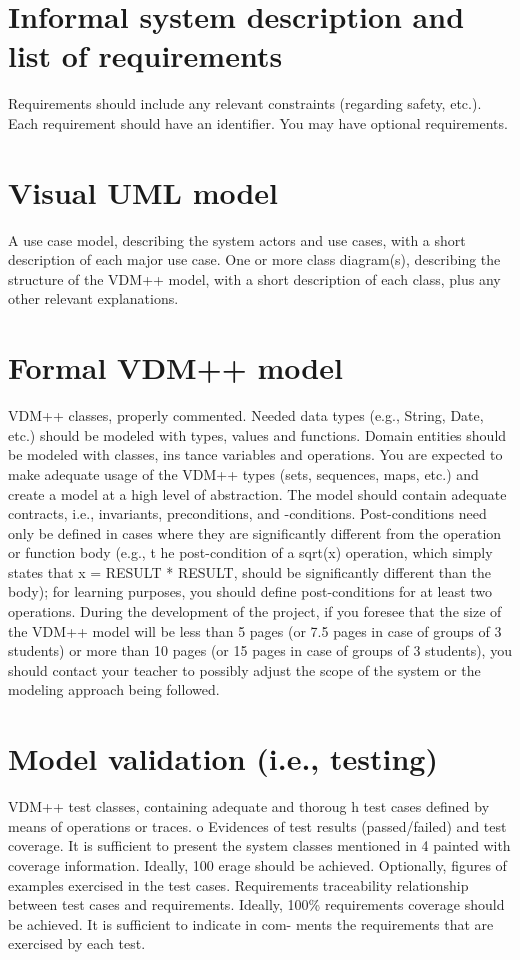 \documentclass[a4paper]{article}
\begin{document}

\newpage
\tableofcontents
\newpage

\section{Informal system description and list of requirements}
Requirements should include any relevant constraints (regarding safety, etc.). 
Each requirement should have an identifier. 
You may have optional requirements. 
\section{Visual UML model}
A use case model, describing the system actors and 
use cases, with a short description 
of each major use case. 
One or more class diagram(s), describing the structure of the VDM++ model, with a 
short description of each class, plus any other relevant explanations. 
\section{Formal VDM++ model}
VDM++ classes, properly commented. 
Needed data types (e.g., String, Date, etc.) should be modeled with types, values and 
functions. 
Domain entities should be modeled with classes, ins
tance variables and operations. 
You are expected to make adequate usage of the VDM++ types (sets, sequences, maps, etc.) and create a model at a high level of abstraction. 
The model should contain adequate contracts, i.e., 
invariants, preconditions, and -conditions. Post-conditions need only be defined in cases where they are significantly different from the operation or function body (e.g., t
he post-condition of a sqrt(x) operation, which simply states that x = RESULT * RESULT, should be significantly different than the body); for learning purposes, you should define post-conditions for at least two operations. 
During the development of the project, if you foresee that the size of the VDM++ model 
will be less than 5 pages (or 7.5 pages in case of 
groups of 3 students) or more than 10 
pages (or 15 pages in case of groups of 3 students), you should contact your teacher to 
possibly adjust the scope of the system or the modeling approach being followed. 
\section{Model validation (i.e., testing)}
VDM++ test classes, containing adequate and thoroug
h test cases defined by means of 
operations or traces.  
o
Evidences of test results (passed/failed) and test 
coverage. It is sufficient to present the 
system classes mentioned in 4 painted with coverage
 information. Ideally, 100%
erage should be achieved. 
Optionally, figures of examples exercised in the test cases. 
Requirements  traceability  relationship  between  test  cases  and requirements.  Ideally, 100\%  requirements  coverage  should  be  achieved.  It  is  sufficient  to  indicate  in  com-
ments the requirements that are exercised by each test. 
\end{document}
